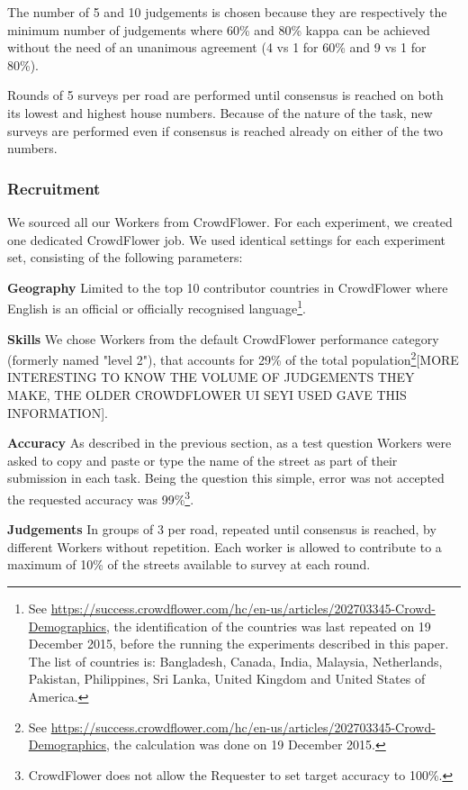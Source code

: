 The number of 5 and 10 judgements is chosen because they are respectively the minimum number of judgements where 60\% and 80\% kappa can be achieved without the need of an unanimous agreement (4 vs 1 for 60\% and 9 vs 1 for 80\%). 

Rounds of 5 surveys per road are performed until consensus is reached on both its lowest and highest house numbers. Because of the nature of the task, new surveys are performed even if consensus is reached already on either of the two numbers.  

\subsubsection{Recruitment}

We sourced all our Workers from CrowdFlower. For each experiment, we created one dedicated CrowdFlower job. We used identical settings for each experiment set, consisting of the following parameters:

\textbf{Geography} Limited to the top 10 contributor countries in CrowdFlower where English is an official or officially recognised language\footnote{See \url{https://success.crowdflower.com/hc/en-us/articles/202703345-Crowd-Demographics}, the identification of the countries was last repeated on 19 December 2015, before the running the experiments described in this paper. The list of countries is: Bangladesh, Canada, India, Malaysia, Netherlands, Pakistan, Philippines, Sri Lanka, United Kingdom and United States of America.}.

\textbf{Skills} We chose Workers from the default CrowdFlower performance category (formerly named "level 2"), that accounts for 29\% of the total population\footnote{See \url{https://success.crowdflower.com/hc/en-us/articles/202703345-Crowd-Demographics}, the calculation was done on 19 December 2015.}[MORE INTERESTING TO KNOW THE VOLUME OF JUDGEMENTS THEY MAKE, THE OLDER CROWDFLOWER UI SEYI USED GAVE THIS INFORMATION].

\textbf{Accuracy} As described in the previous section, as a test question Workers were asked to copy and paste or type the name of the street as part of their submission in each task. Being the question this simple, error was not accepted the requested accuracy was 99\%\footnote{CrowdFlower does not allow the Requester to set target accuracy to 100\%.}.

\textbf{Judgements} In groups of 3 per road, repeated until consensus is reached, by different Workers without repetition. Each worker is allowed to contribute to a maximum of 10\% of the streets available to survey at each round.

